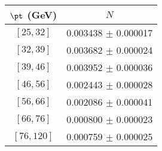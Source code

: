 \begin{tabular}{c||c}
$\pt$ (GeV) & $N$  \\
\hline
$[25, 32]$ & 0.003438 $\pm$ 0.000017\\
$[32, 39]$ & 0.003682 $\pm$ 0.000024\\
$[39, 46]$ & 0.003952 $\pm$ 0.000036\\
$[46, 56]$ & 0.002443 $\pm$ 0.000028\\
$[56, 66]$ & 0.002086 $\pm$ 0.000041\\
$[66, 76]$ & 0.000800 $\pm$ 0.000023\\
$[76, 120]$ & 0.000759 $\pm$ 0.000025\\
\end{tabular}
